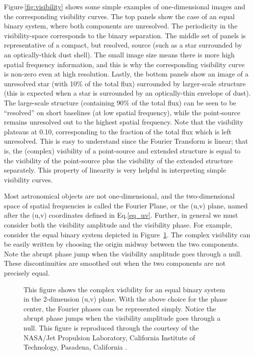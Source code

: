 \documentclass[12pt]{article}
\begin{document}
Figure\,\ref{fig:visibility} shows some simple examples of
one-dimensional images and the corresponding visibility curves.  The
top panels show the case of an equal binary system, where both
components are unresolved.  The periodicity in the visibility-space
corresponds to the binary separation.  The middle set of panels is
representative of a compact, but resolved, source (such as a star
surrounded by an optically-thick dust shell).  The small image size
means there is more high spatial frequency information, and this is why
the corresponding visibility curve is non-zero even at high
resolution. Lastly, the bottom panels show an image of a unresolved
star (with 10\% of the total flux) surrounded by larger-scale
structure (this is expected when a star is surrounded by an
optically-thin envelope of dust).  The large-scale structure
(containing 90\% of the total flux) can be seen to be ``resolved'' on
short baselines (at low spatial frequency), while the point-source
remains unresolved out to the highest spatial frequency.  Note that
the visibility plateaus at 0.10, corresponding to the fraction of the
total flux which is left unresolved.  This is easy to understand since
the Fourier Transform is linear; that is, the (complex) visibility of
a point-source and extended structure is equal to the visibility of
the point-source plus the visibility of the extended structure
separately.  This property of linearity is very helpful in
interpreting simple visibility curves.

Most astronomical objects are not one-dimensional, and the
two-dimensional space of spatial frequencies is called the
Fourier Plane, or the (u,v) plane, named after the (u,v) coordinates
defined in Eq.\ref{eq_uv}.  Further, in general we must consider both the
visibility amplitude and the visibility phase.
For example,
consider the equal binary system depicted in Figure~\ref{monnier_eg1}.
The complex visibility can be easily written by choosing the origin
midway between the two components.  Note the abrupt phase jump when
the visibility amplitude goes through a null.  These discontinuities
are smoothed out when the two components are not precisely equal.

\begin{figure}
\begin{center}
\caption
{This figure shows the complex visibility for an equal binary system
in the 2-dimension (u,v) plane.
With the above choice for the phase center, the Fourier phases can be
represented simply.  Notice the abrupt phase jumps when the 
visibility amplitude goes through a null. This figure is
reproduced through the courtesy
of the NASA/Jet Propulsion Laboratory, 
California Institute of Technology, Pasadena, California \citep{monnier_mss}.
\label{monnier_eg1}}
\end{center}
\end{figure}
\end{document}
